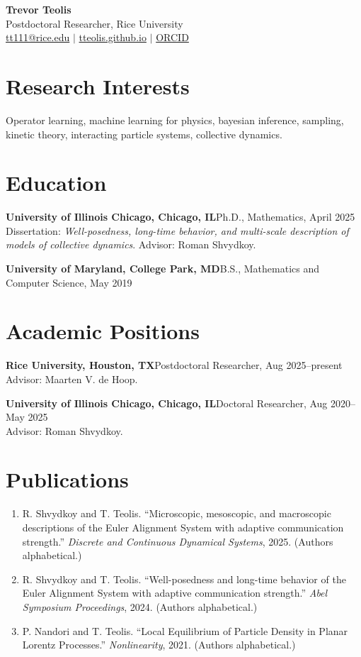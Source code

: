 \documentclass[10pt]{article}
\newcommand{\entry}[2]{\textbf{#1}\hfill #2\\}
\newcommand{\paper}[3]{#1. ``#2.'' #3}
\begin{document}
\begin{center}
  {\LARGE\bfseries Trevor Teolis}\\[3pt]
  Postdoctoral Researcher, Rice University\\
  \href{mailto:tt111@rice.edu}{tt111@rice.edu} $\mid$
  \href{https://tteolis.github.io}{tteolis.github.io} $\mid$
  \href{https://orcid.org/0009-0000-4288-4914}{ORCID}
\end{center}
\fontsize{9}{10.5}\selectfont

\section*{Research Interests}
Operator learning, machine learning for physics, bayesian inference, sampling, kinetic theory, interacting particle systems, collective dynamics.

\section*{Education}
\entry{University of Illinois Chicago, Chicago, IL}{Ph.D., Mathematics, April 2025}
Dissertation: \emph{Well-posedness, long-time behavior, and multi-scale description of models of collective dynamics}. Advisor: Roman Shvydkoy.

\entry{University of Maryland, College Park, MD}{B.S., Mathematics and Computer Science, May 2019}

\section*{Academic Positions}
\entry{Rice University, Houston, TX}{Postdoctoral Researcher, Aug 2025--present}
Advisor: Maarten V. de Hoop.

\entry{University of Illinois Chicago, Chicago, IL}{Doctoral Researcher, Aug 2020--May 2025}
Advisor: Roman Shvydkoy.

\section*{Publications}
\begin{enumerate}
  \item \paper{R. Shvydkoy and T. Teolis}{Microscopic, mesoscopic, and macroscopic descriptions of the Euler Alignment System with adaptive communication strength}{\emph{Discrete and Continuous Dynamical Systems}, 2025.} (Authors alphabetical.)
  \item \paper{R. Shvydkoy and T. Teolis}{Well-posedness and long-time behavior of the Euler Alignment System with adaptive communication strength}{\emph{Abel Symposium Proceedings}, 2024.} (Authors alphabetical.)
  \item \paper{P. Nandori and T. Teolis}{Local Equilibrium of Particle Density in Planar Lorentz Processes}{\emph{Nonlinearity}, 2021.} (Authors alphabetical.)
\end{enumerate}
\end{document}
